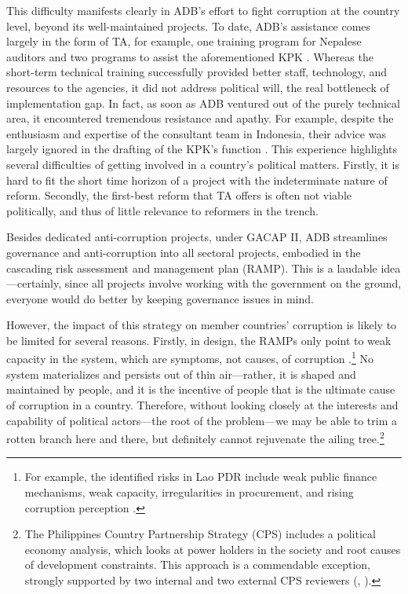 \documentclass[12pt]{article}
\begin{document}
This difficulty manifests clearly in ADB's effort to fight corruption at the country level, beyond its well-maintained projects. To date, ADB's assistance comes largely in the form of TA, for example, one training program for Nepalese auditors and two programs to assist the aforementioned KPK \citep{ADB2003, ADB2005, ADB2011}. Whereas the short-term technical training successfully provided better staff, technology, and resources to the agencies, it did not address political will, the real bottleneck of implementation gap. In fact, as soon as ADB ventured out of the purely technical area, it encountered tremendous resistance and apathy. For example, despite the enthusiasm and expertise of the consultant team in Indonesia, their advice was largely ignored in the drafting of the KPK's function \citep{ADB2003, Schutte2012}. This experience highlights several difficulties of getting involved in a country's political matters. Firstly, it is hard to fit the short time horizon of a project with the indeterminate nature of reform. Secondly, the first-best reform that TA offers is often not viable politically, and thus of little relevance to reformers in the trench.

Besides dedicated anti-corruption projects, under GACAP II, ADB streamlines governance and anti-corruption into all sectoral projects, embodied in the cascading risk assessment and management plan (RAMP). This is a laudable idea---certainly, since all projects involve working with the government on the ground, everyone would do better by keeping governance issues in mind.

However, the impact of this strategy on member countries' corruption is likely to be limited for several reasons. Firstly, in design, the RAMPs only point to weak capacity in the system, which are symptoms, not causes, of corruption \citep[6]{ADB2013}.\footnote{For example, the identified risks in Lao PDR include weak public finance mechanisms, weak capacity, irregularities in procurement, and rising corruption perception \citep{ADB2011a}.} No system materializes and persists out of thin air---rather, it is shaped and maintained by people, and it is the incentive of people that is the ultimate cause of corruption in a country. Therefore, without looking closely at the interests and capability of political actors---the root of the problem---we may be able to trim a rotten branch here and there, but definitely cannot rejuvenate the ailing tree.\footnote{The Philippines Country Partnership Strategy (CPS) includes a political economy analysis, which looks at power holders in the society and root causes of development constraints. This approach is a commendable exception, strongly supported by two internal and two external CPS reviewers (\citealp{ADB2010}, \citealp{ADB2011b}).}
\end{document}
